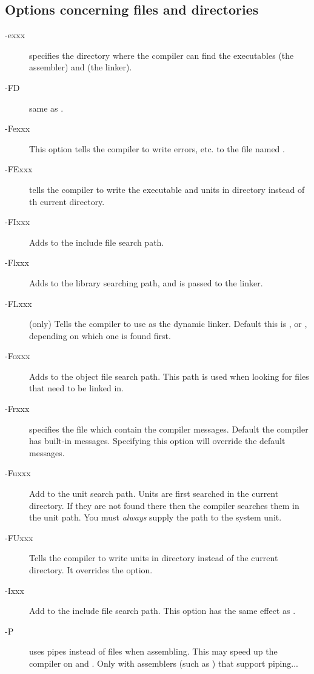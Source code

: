 \documentclass{book}
\begin{document}
%
%
\subsection{Options concerning files and directories}
\begin{description}
\item [-exxx]  specifies the directory where the
compiler can find the executables  (the assembler) and 
(the linker).
\item [-FD] same as .
\item [-Fexxx] This option tells the compiler to write errors, etc. to
the file named .
\item [-FExxx] tells the compiler to write the executable and units in
directory  instead of th current directory.
\item [-FIxxx] Adds  to the include file search path.
\item [-Flxxx] Adds  to the library searching path, and is passed
to the linker.
\item[-FLxxx] (\linux only) Tells the compiler to use  as the
dynamic linker. Default this is , or
, depending on which one is found first.
\item[-Foxxx] Adds  to the object file search path.
This path is used when looking for files that need to be linked in.
\item [-Frxxx]  specifies the file which contain the compiler
messages. Default the compiler has built-in messages. Specifying this option
will override the default messages.
\item [-Fuxxx] Add  to the unit search path.
Units are first searched in the current directory.
If they are not found there then the compiler searches them in the unit path.
You must {\em always} supply the path to the system unit.
\item [-FUxxx] Tells the compiler to write units in directory 
instead of the current directory. It overrides the  option.
\item [-Ixxx]  Add  to the include file search path.
This option has the same effect as .
\item [-P] uses pipes instead of files when assembling. This may speed up
the compiler on \ostwo and \linux. Only with assemblers (such as \gnu
{}) that support piping...
\end{description}
\end{document}
